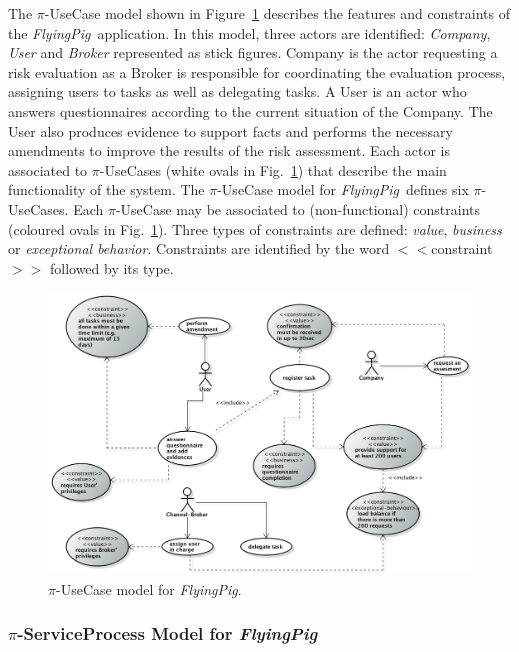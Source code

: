 \documentclass{singlecol-new}
\theoremstyle{TH}{
\newtheorem{lemma}{Lemma}
\newtheorem{theorem}[lemma]{Theorem}
\newtheorem{corrolary}[lemma]{Corrolary}
\newtheorem{conjecture}[lemma]{Conjecture}
\newtheorem{proposition}[lemma]{Proposition}
\newtheorem{claim}[lemma]{Claim}
\newtheorem{stheorem}[lemma]{Wrong Theorem}
\newtheorem{algorithm}{Algorithm}
}
\theoremstyle{THrm}{
\newtheorem{definition}{Definition}[section]
\newtheorem{question}{Question}[section]
\newtheorem{remark}{Remark}
\newtheorem{scheme}{Scheme}
}
\theoremstyle{THhit}{
\newtheorem{case}{Case}[section]
}
\theoremstyle{THhsl}{
\newtheorem{example}{Example}
}
\def\FlyingPig{\textsl{FlyingPig}\xspace}
\begin{document}
The $\pi$-UseCase model shown in Figure~\ref{fig:piUseCaseModel} describes the features and constraints of the \FlyingPig\ application.
In this model, three actors are identified: \textit{Company}, \textit{User} and \textit {Broker} represented as stick figures.
Company is the actor requesting a risk evaluation as a Broker is  responsible for coordinating  the evaluation process, assigning users to tasks as well as delegating tasks.
A User is an actor who answers questionnaires according to the current situation  of the Company.
The User also produces evidence to support facts and performs the necessary amendments to improve the results of the risk assessment.
Each actor is associated to $\pi$-UseCases (white ovals in Fig.~\ref{fig:piUseCaseModel})
that describe the main functionality of the system.
The $\pi$-UseCase model for \FlyingPig\ defines six $\pi$-UseCases.
Each $\pi$-UseCase may be associated to (non-functional) constraints (coloured ovals in Fig.~\ref{fig:piUseCaseModel}).%
Three types of constraints are defined: \textit{value}, \textit{business} or \textit{exceptional behavior}.
Constraints are identified by the word $<<$\textsf{constraint}$>>$ followed by its type.

\begin{figure}[h]
\centering
\includegraphics[width=1\textwidth]{./figures/UseCaseGeneral.png}
\caption{$\pi$-UseCase model for \FlyingPig.\label{fig:piUseCaseModel}}
\end{figure}

\subsubsection{$\pi$-ServiceProcess Model for \FlyingPig}
\end{document}
